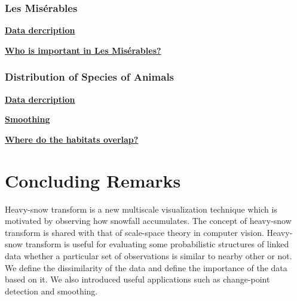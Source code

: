 \documentclass[preprint, review, 12pt]{article}
\theoremstyle{definition}
\theoremstyle{remark}
\begin{document}
\subsubsection{Les Misérables}
\noindent\textbf{\underline{Data dercription}}

\noindent\textbf{\underline{Who is important in Les Misérables?}}

\subsubsection{Distribution of Species of Animals} 
\noindent\textbf{\underline{Data dercription}}

\noindent\textbf{\underline{Smoothing}}

\noindent\textbf{\underline{Where do the habitats overlap?}}

\section{Concluding Remarks}
Heavy-snow transform is a new multiscale visualization technique which is motivated by observing how snowfall accumulates. The concept of heavy-snow transform is shared with that of scale-space theory in computer vision. Heavy-snow transform is useful for evaluating some probabilistic structures of linked data whether a particular set of observations is similar to nearby other or not. We define the dissimilarity of the data and define the importance of the data based on it. We also introduced useful applications such as change-point detection and smoothing.
\end{document}
